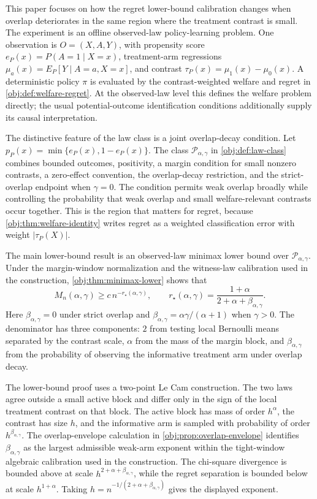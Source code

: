 This paper focuses on how the regret lower-bound calibration changes when overlap deteriorates in the same region where the treatment contrast is small.  The experiment is an offline observed-law policy-learning problem.  One observation is \(O=(X,A,Y)\), with propensity score \(e_P(x)=P(A=1\mid X=x)\), treatment-arm regressions \(\mu_a(x)=E_P[Y\mid A=a,X=x]\), and contrast \(\tau_P(x)=\mu_1(x)-\mu_0(x)\).  A deterministic policy \(\pi\) is evaluated by the contrast-weighted welfare and regret in \cref{obj:def:welfare-regret}.  At the observed-law level this defines the welfare problem directly; the usual potential-outcome identification conditions additionally supply its causal interpretation.

The distinctive feature of the law class is a joint overlap-decay condition.  Let \(p_P(x)=\min\{e_P(x),1-e_P(x)\}\).  The class \(\mathcal P_{\alpha,\gamma}\) in \cref{obj:def:law-class} combines bounded outcomes, positivity, a margin condition for small nonzero contrasts, a zero-effect convention, the overlap-decay restriction, and the strict-overlap endpoint when \(\gamma=0\).  The condition permits weak overlap broadly while controlling the probability that weak overlap and small welfare-relevant contrasts occur together.  This is the region that matters for regret, because \cref{obj:thm:welfare-identity} writes regret as a weighted classification error with weight \(|\tau_P(X)|\).

The main lower-bound result is an observed-law minimax lower bound over \(\mathcal P_{\alpha,\gamma}\).  Under the margin-window normalization and the witness-law calibration used in the construction, \cref{obj:thm:minimax-lower} shows that
\[
M_n(\alpha,\gamma)\ge c\,n^{-r_\star(\alpha,\gamma)},
\qquad
r_\star(\alpha,\gamma)
=
\frac{1+\alpha}{2+\alpha+\beta_{\alpha,\gamma}} .
\]
Here \(\beta_{\alpha,\gamma}=0\) under strict overlap and \(\beta_{\alpha,\gamma}=\alpha\gamma/(\alpha+1)\) when \(\gamma>0\).  The denominator has three components: \(2\) from testing local Bernoulli means separated by the contrast scale, \(\alpha\) from the mass of the margin block, and \(\beta_{\alpha,\gamma}\) from the probability of observing the informative treatment arm under overlap decay.

The lower-bound proof uses a two-point Le Cam construction.  The two laws agree outside a small active block and differ only in the sign of the local treatment contrast on that block.  The active block has mass of order \(h^\alpha\), the contrast has size \(h\), and the informative arm is sampled with probability of order \(h^{\beta_{\alpha,\gamma}}\).  The overlap-envelope calculation in \cref{obj:prop:overlap-envelope} identifies \(\beta_{\alpha,\gamma}\) as the largest admissible weak-arm exponent within the tight-window algebraic calibration used in the construction.  The chi-square divergence is bounded above at scale \(h^{2+\alpha+\beta_{\alpha,\gamma}}\), while the regret separation is bounded below at scale \(h^{1+\alpha}\).  Taking \(h=n^{-1/(2+\alpha+\beta_{\alpha,\gamma})}\) gives the displayed exponent.

